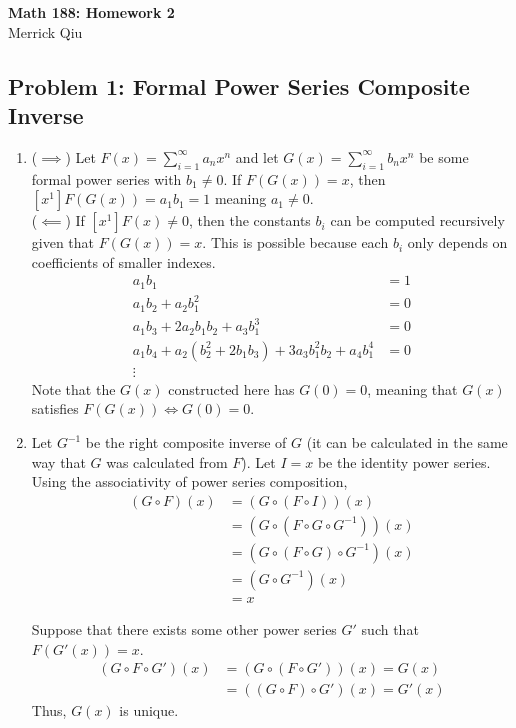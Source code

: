 \documentclass{report}
\begin{document}
\begin{center}
	\huge{\bf Math 188: Homework 2} \\
	Merrick Qiu
\end{center}

\subsection*{Problem 1: Formal Power Series Composite Inverse}
\begin{enumerate}
    \item ($\implies$) Let $F(x) = \sum_{i=1}^{\infty} a_n x^n$ and
         let $G(x) = \sum_{i=1}^{\infty} b_n x^n$ 
         be some formal power series with $b_1 \neq 0$.
         If $F(G(x)) = x$, then $[x^1]F(G(x)) = a_1b_1 = 1$ meaning $a_1 \neq 0$. \\
         ($\impliedby$) If $[x^1]F(x) \neq 0$, then the constants $b_i$ can be computed recursively 
         given that $F(G(x)) = x$. This is possible because each $b_i$ only depends on coefficients of smaller indexes.
         \begin{align*}
            a_1b_1 &= 1 \\
            a_1b_2 + a_2b_1^2 &= 0 \\
            a_1b_3 + 2a_2b_1b_2 + a_3b_1^3 &= 0 \\
            a_1b_4 + a_2(b_2^2 + 2b_1b_3) + 3a_3b_1^2b_2 + a_4b_1^4 &= 0 \\
            \vdots
         \end{align*}
         Note that the $G(x)$ constructed here has $G(0) = 0$, meaning that $G(x)$
         satisfies $ F(G(x)) \iff G(0) = 0$.
    \item Let $G^{-1}$ be the right composite inverse of $G$ (it can be calculated
         in the same way that $G$ was calculated from $F$).
         Let $I = x$ be the identity power series.
         Using the associativity of power series composition,
         \begin{align*}
            (G \circ F)(x) &= (G \circ (F \circ I))(x) \\
            &= (G \circ (F \circ G \circ G^{-1}))(x) \\
            &= (G \circ (F \circ G) \circ G^{-1})(x) \\
            &=(G \circ G^{-1})(x) \\
            &= x
         \end{align*} 

         Suppose that there exists some other power series $G'$ such that $F(G'(x)) = x$.
         \begin{align*}
            (G \circ F \circ G') (x) 
            &= (G \circ (F \circ G')) (x)  = G(x) \\
            &= ((G \circ F) \circ G') (x) = G'(x)
         \end{align*}
         Thus, $G(x)$ is unique.
\end{enumerate}
\newpage 
\end{document}

